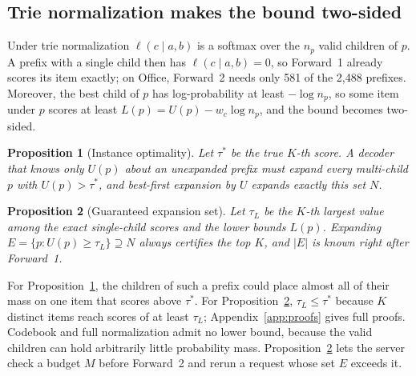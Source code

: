 \documentclass[sigconf,anonymous]{acmart}
\newcommand{\lp}{\ell}
\newcommand{\U}{U}
\newtheorem{proposition}{Proposition}
\begin{document}
\subsection{Trie normalization makes the bound two-sided}
\label{sec:twosided}
Under trie normalization $\lp(c\mid a,b)$ is a softmax over the $n_p$ valid children of $p$. A prefix with a
single child then has $\lp(c\mid a,b)=0$, so Forward~1 already scores its item exactly; on Office, Forward~2 needs
only 581 of the 2,488 prefixes. Moreover, the best child of $p$ has log-probability at least $-\log n_p$, so some
item under $p$ scores at least $L(p)=\U(p)-w_c\log n_p$, and the bound becomes two-sided.

\begin{proposition}[Instance optimality]\label{prop:necessary}
Let $\tau^*$ be the true $K$-th score. A decoder that knows only $\U(p)$ about an unexpanded prefix must expand
every multi-child $p$ with $\U(p)>\tau^*$, and best-first expansion by $\U$ expands exactly this set $N$.
\end{proposition}

\begin{proposition}[Guaranteed expansion set]\label{prop:guaranteed}
Let $\tau_L$ be the $K$-th largest value among the exact single-child scores and the lower bounds $L(p)$. Expanding
$E=\{p:\U(p)\ge\tau_L\}\supseteq N$ always certifies the top $K$, and $|E|$ is known right after Forward~1.
\end{proposition}
\noindent For Proposition~\ref{prop:necessary}, the children of such a prefix could place almost all of their mass
on one item that scores above $\tau^*$. For Proposition~\ref{prop:guaranteed}, $\tau_L\le\tau^*$ because $K$
distinct items reach scores of at least $\tau_L$; Appendix~\ref{app:proofs} gives full proofs. Codebook and full
normalization admit no lower bound, because the valid children can hold arbitrarily little probability mass.
Proposition~\ref{prop:guaranteed} lets the server check a budget $M$ before Forward~2 and rerun a request whose set
$E$ exceeds it.
\end{document}
